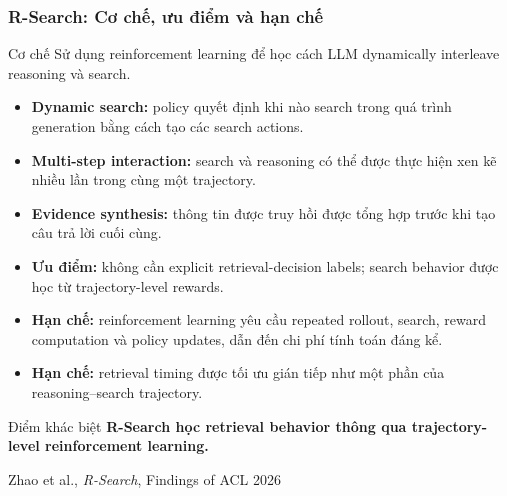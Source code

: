 \begin{frame}
    \frametitle{R-Search: Cơ chế, ưu điểm và hạn chế}

    \small

    \begin{block}{Cơ chế}
        Sử dụng reinforcement learning để học cách LLM
        dynamically interleave reasoning và search.
    \end{block}

    \vspace{0.15cm}

    \begin{itemize}
        \setlength{\itemsep}{4pt}

        \item \textbf{Dynamic search:}
        policy quyết định khi nào search trong quá trình generation
        bằng cách tạo các search actions.

        \item \textbf{Multi-step interaction:}
        search và reasoning có thể được thực hiện xen kẽ nhiều lần
        trong cùng một trajectory.

        \item \textbf{Evidence synthesis:}
        thông tin được truy hồi được tổng hợp trước khi
        tạo câu trả lời cuối cùng.

        \item \textbf{Ưu điểm:}
        không cần explicit retrieval-decision labels;
        search behavior được học từ trajectory-level rewards.

        \item \textbf{Hạn chế:}
        reinforcement learning yêu cầu repeated rollout,
        search, reward computation và policy updates,
        dẫn đến chi phí tính toán đáng kể.

        \item \textbf{Hạn chế:}
        retrieval timing được tối ưu gián tiếp như một phần của
        reasoning--search trajectory.

    \end{itemize}

    \vspace{0.05cm}

    \begin{block}{Điểm khác biệt}
        \centering
        \textbf{R-Search học retrieval behavior thông qua
        trajectory-level reinforcement learning.}
    \end{block}

    \vspace{0.02cm}

    \begin{center}
        \scriptsize
        Zhao et al., \textit{R-Search}, Findings of ACL 2026
    \end{center}

\end{frame}


